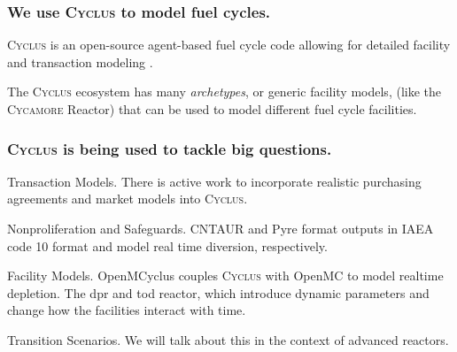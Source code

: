 \documentclass[9pt]{beamer}
\newcommand{\cycamore}{\textsc{Cycamore}\xspace}
\newcommand{\cyclus}{\textsc{Cyclus}\xspace}
\begin{document}
\begin{frame}
  \frametitle{We use \cyclus to model fuel cycles.}
  \vspace{10pt}
  \cyclus is an open-source agent-based fuel cycle code allowing for detailed facility and transaction modeling \cite{huff_fundamental_2016}.
  \begin{center}
  \end{center} %

  The \cyclus ecosystem has many \textit{archetypes}, or generic facility models, (like the \cycamore Reactor) that can be used to model different fuel cycle facilities.
  \end{frame}

  \begin{frame}
    \frametitle{\cyclus is being used to tackle big questions.}
    \begin{block}{Transaction Models.}
        There is active work to incorporate realistic purchasing agreements and market models into \cyclus.
    \end{block} %
    \begin{block}{Nonproliferation and Safeguards.}
        CNTAUR \cite{mummah_advanced_2024} and Pyre \cite{westphal_modeling_2019} format outputs in IAEA code 10 format and model real time diversion, respectively.
    \end{block} %
    \begin{block}{Facility Models.}
      OpenMCyclus \cite{openmcyclus_paper} couples \cyclus with OpenMC to model realtime depletion. The \gls{dpr} and \gls{tod} reactor, which introduce dynamic parameters and change how the facilities interact with time.
  \end{block} %
    \begin{block}{Transition Scenarios.}
        We will talk about this in the context of advanced reactors.
    \end{block}
  \end{frame}
\end{document}
